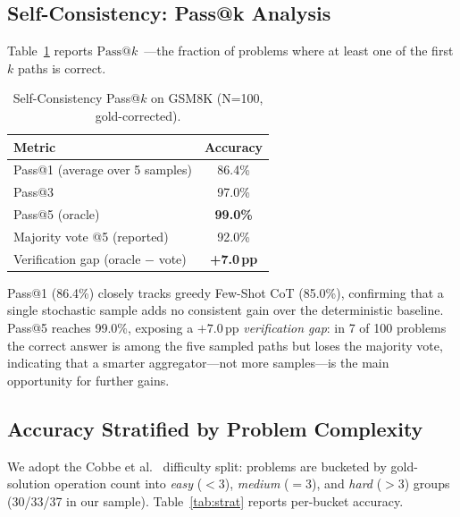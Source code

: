 ﻿\documentclass[runningheads]{llncs}
\begin{document}
\subsection{Self-Consistency: Pass@k Analysis}
\label{sec:results:passk}

Table~\ref{tab:passk} reports $\text{Pass@}k$~\cite{chen2021codex}---the
fraction of problems where at least one of the first $k$ paths is correct.

\begin{table}[H]
\centering
\caption{Self-Consistency Pass@$k$ on GSM8K (N=100, gold-corrected).}
\label{tab:passk}
\begin{tabular}{@{}lc@{}}
\toprule
\textbf{Metric} & \textbf{Accuracy} \\
\midrule
Pass@1 (average over 5 samples)   & 86.4\% \\
Pass@3                            & 97.0\% \\
Pass@5 (oracle)                   & \textbf{99.0\%} \\
\midrule
Majority vote @5 (reported)       & 92.0\% \\
Verification gap (oracle $-$ vote) & \textbf{+7.0\,pp} \\
\bottomrule
\end{tabular}
\end{table}

Pass@1 (86.4\%) closely tracks greedy Few-Shot CoT (85.0\%), confirming
that a single stochastic sample adds no consistent gain over the
deterministic baseline.
Pass@5 reaches 99.0\%, exposing a $+7.0$\,pp \textit{verification gap}:
in 7 of 100 problems the correct answer is among the five sampled paths
but loses the majority vote, indicating that a smarter aggregator---not
more samples---is the main opportunity for further gains.

\subsection{Accuracy Stratified by Problem Complexity}
\label{sec:results:stratified}

We adopt the Cobbe et al.~\cite{cobbe2021gsm8k} difficulty split:
problems are bucketed by gold-solution operation count into
\textit{easy} ($<3$), \textit{medium} ($=3$), and \textit{hard}
($>3$) groups (30/33/37 in our sample).
Table~\ref{tab:strat} reports per-bucket accuracy.
\end{document}
